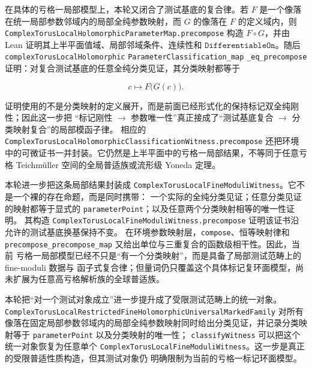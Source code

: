 \documentclass[UTF8,fontset=none,a4paper,11pt]{ctexart}
\begin{document}
在具体的亏格一局部模型上，本轮又闭合了测试基底的复合律。若
$F$ 是一个像落在统一局部参数邻域内的局部全纯参数映射，而
$G$ 的像落在 $F$ 的定义域内，则
\texttt{ComplexTorusLocalHolomorphicParameterMap.precompose} 构造
$F\circ G$，并由 Lean 证明其上半平面值域、局部邻域条件、连续性和
$\texttt{DifferentiableOn}$。随后
\texttt{complexTorusLocalHolomorphic}
\allowbreak\texttt{ParameterClassification\_map}
\allowbreak\texttt{\_eq\_precompose}
证明：对复合测试基底的任意全纯分类见证，其分类映射都等于

\[
  c\longmapsto F\bigl(G(c)\bigr).
\]

证明使用的不是分类映射的定义展开，而是前面已经形式化的保持标记双全纯刚性；因此这一步把
“标记刚性 $\to$ 参数唯一性”真正接成了“测试基底复合 $\to$ 分类映射复合”的局部模函子律。
相应的 \texttt{ComplexTorusLocalHolomorphicClassificationWitness.precompose}
还把环境中的可微证书一并封装。它仍然是上半平面中的亏格一局部结果，不等同于任意亏格
Teichmüller 空间的全局普适族或流形级 Yoneda 定理。

本轮进一步把这条局部结果封装成
\texttt{ComplexTorusLocalFineModuliWitness}。它不是一个裸的存在命题，而是同时携带：
一个实际的全纯分类见证；任意分类见证的映射都等于显式的
\texttt{parameterPoint}；以及任意两个分类映射相等的唯一性证明。
其构造
\texttt{ComplexTorusLocalFineModuliWitness.precompose} 证明该证书沿允许的测试基底换基保持不变。
在环境参数映射层，\texttt{compose}、恒等映射律和
\texttt{precompose\_precompose\_map} 又给出单位与三重复合的函数级相干性。因此，当前
亏格一局部模型已经不只是“有一个分类映射”，而是具备了局部测试范畴上的 fine-moduli 数据与
函子式复合律；但量词仍只覆盖这个具体标记复环面模型，尚未扩展为任意高亏格解析族的全球普适族。

本轮把“对一个测试对象成立”进一步提升成了受限测试范畴上的统一对象。\linebreak[4]
\texttt{ComplexTorusLocalRestrictedFine}\linebreak[4]
\texttt{HolomorphicUniversal}\linebreak[4]\texttt{MarkedFamily}
对所有像落在固定局部参数邻域内的局部全纯参数映射同时给出分类见证，并记录分类映射等于
\texttt{parameterPoint} 以及分类映射的唯一性；
\texttt{classifyWitness} 可以把这个统一对象恢复为任意单个
\texttt{ComplexTorusLocalFineModuliWitness}。这一步是真正的受限普适性质构造，但其测试对象仍
明确限制为当前的亏格一标记环面模型。
\end{document}
